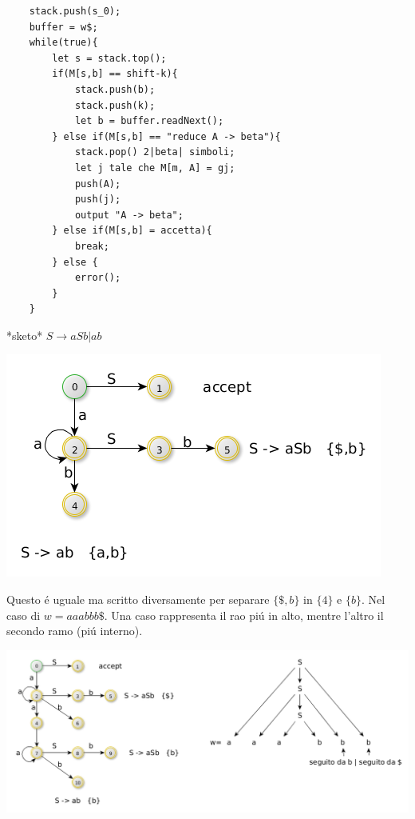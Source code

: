 \begin{lstlisting}
    stack.push(s_0);
    buffer = w$;
    while(true){
        let s = stack.top();
        if(M[s,b] == shift-k){
            stack.push(b);
            stack.push(k);
            let b = buffer.readNext(); 
        } else if(M[s,b] == "reduce A -> beta"){
            stack.pop() 2|beta| simboli;
            let j tale che M[m, A] = gj;
            push(A);
            push(j);
            output "A -> beta";
        } else if(M[s,b] = accetta){
            break;
        } else {
            error();
        }
    }
\end{lstlisting}

*sketo*
$S \rightarrow aSb | ab $

\begin{center}
    \includegraphics[scale=0.4]{Chapters/Img/c02_15.png}\\
\end{center} 

Questo \'e uguale ma scritto diversamente per separare $\{ \$, b\}$ in $\{4\}$ e $\{b\}$. Nel caso di $w=aaabbb\$$. Una caso rappresenta
il rao pi\'u in alto, mentre l'altro il secondo ramo (pi\'u interno).

\begin{center}
    \includegraphics[scale=0.4]{Chapters/Img/c02_16.png}\\
\end{center} 

